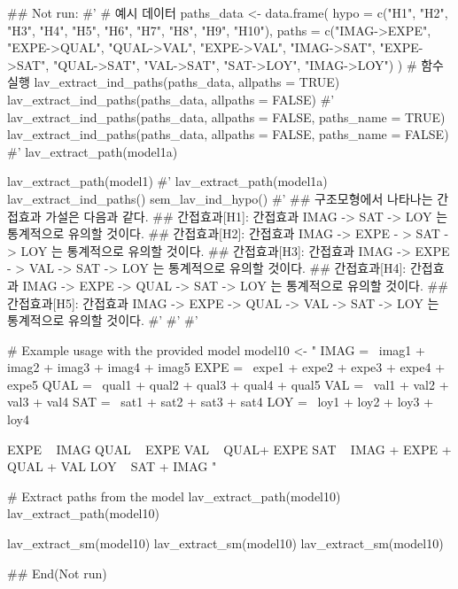 \documentclass[a4paper]{book}
\begin{document}
\begin{Examples}
\begin{ExampleCode}

\#\# Not run: 
#'
# 예시 데이터
paths_data <- data.frame(
  hypo = c("H1", "H2", "H3", "H4", "H5",
  "H6", "H7", "H8", "H9", "H10"),
  paths = c("IMAG->EXPE", "EXPE->QUAL",
  "QUAL->VAL", "EXPE->VAL", "IMAG->SAT",
   "EXPE->SAT", "QUAL->SAT", "VAL->SAT", "SAT->LOY", "IMAG->LOY")
)
# 함수 실행
lav_extract_ind_paths(paths_data, allpaths = TRUE)
lav_extract_ind_paths(paths_data, allpaths = FALSE)
#'
lav_extract_ind_paths(paths_data, allpaths = FALSE, paths_name = TRUE)
lav_extract_ind_paths(paths_data, allpaths = FALSE, paths_name = FALSE)
#'
lav_extract_path(model1a)%

lav_extract_path(model1)%
#'
lav_extract_path(model1a) %
  lav_extract_ind_paths() %
  sem_lav_ind_hypo()
#'
## 구조모형에서 나타나는 간접효과 가설은 다음과 같다.
## 간접효과[H1]: 간접효과 IMAG -> SAT ->
LOY 는 통계적으로 유의할 것이다.
## 간접효과[H2]: 간접효과 IMAG -> EXPE -
> SAT -> LOY 는 통계적으로 유의할 것이다.
## 간접효과[H3]: 간접효과 IMAG -> EXPE -
> VAL -> SAT -> LOY 는 통계적으로 유의할 것이다.
## 간접효과[H4]: 간접효과 IMAG -> EXPE
-> QUAL -> SAT -> LOY 는 통계적으로 유의할 것이다.
## 간접효과[H5]: 간접효과 IMAG -> EXPE
-> QUAL -> VAL -> SAT -> LOY 는 통계적으로 유의할 것이다.
#' #'
#'

# Example usage with the provided model
model10 <- "
IMAG =~ imag1 + imag2 + imag3 + imag4 + imag5
EXPE =~ expe1 + expe2 + expe3 + expe4 + expe5
QUAL =~ qual1 + qual2 + qual3 + qual4 + qual5
VAL =~ val1 + val2 + val3 + val4
SAT =~ sat1 + sat2 + sat3 + sat4
LOY =~ loy1 + loy2 + loy3 + loy4

EXPE ~ IMAG
QUAL ~ EXPE
VAL ~  QUAL+ EXPE
SAT ~ IMAG + EXPE + QUAL + VAL
LOY ~ SAT + IMAG
"


# Extract paths from the model
lav_extract_path(model10)
lav_extract_path(model10)%

lav_extract_sm(model10)%
lav_extract_sm(model10)%
lav_extract_sm(model10)%


## End(Not run)

\end{ExampleCode}
\end{Examples}
\end{document}
